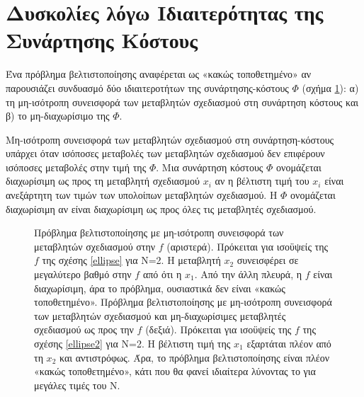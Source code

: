 \section{Δυσκολίες λόγω Ιδιαιτερότητας της Συνάρτησης Κόστους}
Ένα πρόβλημα βελτιστοποίησης αναφέρεται ως «κακώς τοποθετημένο» αν παρουσιάζει συνδυασμό δύο ιδιαιτεροτήτων της συνάρτησης-κόστους $\Phi$ (σχήμα \ref{nonsep}): α) τη μη-ισότροπη συνεισφορά των μεταβλητών σχεδιασμού στη συνάρτηση κόστους και β) το μη-διαχωρίσιμο της $\Phi$.

Μη-ισότροπη συνεισφορά των μεταβλητών σχεδιασμού στη συνάρτηση-κόστους υπάρχει όταν ισόποσες μεταβολές των μεταβλητών σχεδιασμού δεν επιφέρουν ισόποσες μεταβολές στην τιμή της $\Phi$.  Μια συνάρτηση κόστους $\Phi$ ονομάζεται διαχωρίσιμη ως προς τη μεταβλητή σχεδιασμού $x_i$ αν η βέλτιστη τιμή του $x_i$ είναι ανεξάρτητη των τιμών των υπολοίπων μεταβλητών σχεδιασμού. Η $\Phi$ ονομάζεται διαχωρίσιμη αν είναι διαχωρίσιμη ως προς όλες τις μεταβλητές σχεδιασμού.        

\begin{figure}[h!]
\begin{minipage}[b]{1\linewidth}
 \centering
\end{minipage}
\caption{Πρόβλημα βελτιστοποίησης με μη-ισότροπη συνεισφορά των μεταβλητών σχεδιασμού στην $f$ (αριστερά). Πρόκειται για ισοϋψείς της $f$ της σχέσης \ref{ellipse} για Ν=2. Η μεταβλητή $x_2$ συνεισφέρει σε μεγαλύτερο βαθμό στην $f$ από ότι η $x_1$. Από την άλλη πλευρά, η $f$ είναι διαχωρίσιμη, άρα το πρόβλημα, ουσιαστικά δεν είναι «κακώς τοποθετημένο». Πρόβλημα βελτιστοποίησης με μη-ισότροπη συνεισφορά των μεταβλητών σχεδιασμού και μη-διαχωρίσιμες μεταβλητές σχεδιασμού ως προς την $f$ (δεξιά). Πρόκειται για ισοϋψείς της $f$ της σχέσης \ref{ellipse2} για Ν=2. Η βέλτιστη τιμή της $x_1$ εξαρτάται πλέον από τη $x_2$ και αντιστρόφως. Άρα, το πρόβλημα βελτιστοποίησης είναι πλέον «κακώς τοποθετημένο», κάτι που θα φανεί ιδιαίτερα λύνοντας το για μεγάλες τιμές του Ν.} 
\label{nonsep}
\end{figure}

